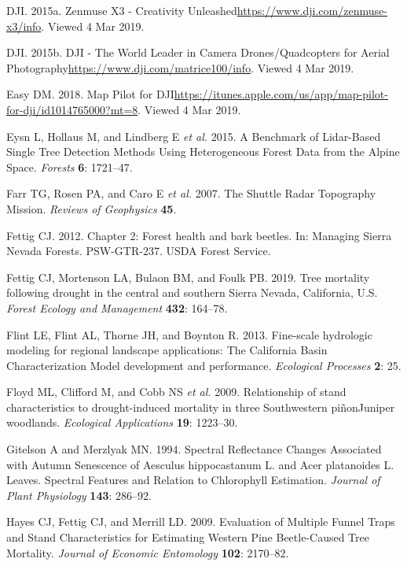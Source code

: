 \documentclass[]{article}
\begin{document}
\hypertarget{ref-dji2015}{}
DJI. 2015a. Zenmuse X3 - Creativity
Unleashed\url{https://www.dji.com/zenmuse-x3/info}. Viewed 4 Mar 2019.

\hypertarget{ref-dji2015a}{}
DJI. 2015b. DJI - The World Leader in Camera Drones/Quadcopters for
Aerial Photography\url{https://www.dji.com/matrice100/info}. Viewed 4
Mar 2019.

\hypertarget{ref-dronesmadeeasy2018}{}
Easy DM. 2018. ‎Map Pilot for
DJI\url{https://itunes.apple.com/us/app/map-pilot-for-dji/id1014765000?mt=8}.
Viewed 4 Mar 2019.

\hypertarget{ref-eysn2015}{}
Eysn L, Hollaus M, and Lindberg E \emph{et al.} 2015. A Benchmark of
Lidar-Based Single Tree Detection Methods Using Heterogeneous Forest
Data from the Alpine Space. \emph{Forests} \textbf{6}: 1721--47.

\hypertarget{ref-farr2007}{}
Farr TG, Rosen PA, and Caro E \emph{et al.} 2007. The Shuttle Radar
Topography Mission. \emph{Reviews of Geophysics} \textbf{45}.

\hypertarget{ref-fettig2012b}{}
Fettig CJ. 2012. Chapter 2: Forest health and bark beetles. In: Managing
Sierra Nevada Forests. PSW-GTR-237. USDA Forest Service.

\hypertarget{ref-fettig2019}{}
Fettig CJ, Mortenson LA, Bulaon BM, and Foulk PB. 2019. Tree mortality
following drought in the central and southern Sierra Nevada, California,
U.S. \emph{Forest Ecology and Management} \textbf{432}: 164--78.

\hypertarget{ref-flint2013}{}
Flint LE, Flint AL, Thorne JH, and Boynton R. 2013. Fine-scale
hydrologic modeling for regional landscape applications: The California
Basin Characterization Model development and performance.
\emph{Ecological Processes} \textbf{2}: 25.

\hypertarget{ref-floyd2009}{}
Floyd ML, Clifford M, and Cobb NS \emph{et al.} 2009. Relationship of
stand characteristics to drought-induced mortality in three Southwestern
piñonJuniper woodlands. \emph{Ecological Applications} \textbf{19}:
1223--30.

\hypertarget{ref-gitelson1994}{}
Gitelson A and Merzlyak MN. 1994. Spectral Reflectance Changes
Associated with Autumn Senescence of Aesculus hippocastanum L. and Acer
platanoides L. Leaves. Spectral Features and Relation to Chlorophyll
Estimation. \emph{Journal of Plant Physiology} \textbf{143}: 286--92.

\hypertarget{ref-hayes2009}{}
Hayes CJ, Fettig CJ, and Merrill LD. 2009. Evaluation of Multiple Funnel
Traps and Stand Characteristics for Estimating Western Pine
Beetle-Caused Tree Mortality. \emph{Journal of Economic Entomology}
\textbf{102}: 2170--82.
\end{document}

